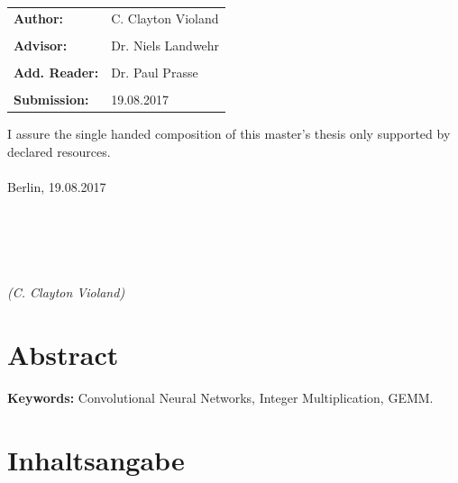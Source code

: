 \documentclass[12pt]{report}
\begin{document}
\vfill

\begin{tabular}{ll}
{\Large \bf Author:} & {\Large C. Clayton Violand} \\\\
{\Large \bf Advisor:} & {\Large Dr. Niels Landwehr} \\\\
{\Large \bf Add. Reader:} & {\Large Dr. Paul Prasse} \\\\
{\Large \bf Submission:} & {\Large 19.08.2017}
\end{tabular}

\newpage	
\thispagestyle{empty}
\hoffset=0mm
\vspace*{\fill}
\noindent I assure the single handed composition of this master's thesis only supported by declared resources.\\\\
Berlin, 19.08.2017\\\\\\\\\\\\
\noindent \textit{(C. Clayton Violand)}

\newpage
\thispagestyle{empty}
\null

\newpage
\thispagestyle{empty}
\hoffset=0mm
\section*{Abstract}	
\begin{spacing}{1.2}

\end{spacing}

\bigskip
\providecommand{\keywords}[1]{\textbf{Keywords:} #1}
\keywords{Convolutional Neural Networks, Integer Multiplication, GEMM.}

\section*{Inhaltsangabe}
\begin{spacing}{1.2}

\end{spacing}

\newpage
\setcounter{page}{1}
\hoffset=0mm
\setcounter{tocdepth}{3}
\setcounter{secnumdepth}{3}
\fboxsep 0mm

\tableofcontents

\newpage
\setlength{\baselineskip}{3ex}
\end{document}
